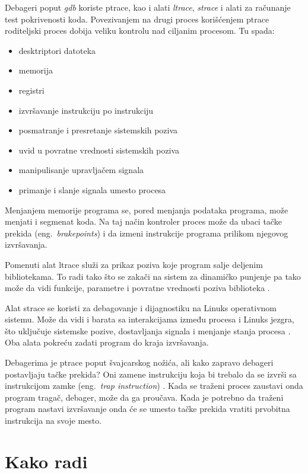 \documentclass[a4paper]{article}
\begin{document}
Debageri poput \emph{gdb} koriste ptrace, kao i alati \emph{ltrace}, \emph{strace} i alati za računanje test pokrivenosti koda.
Povezivanjem na drugi proces korišćenjem ptrace roditeljski proces dobija veliku kontrolu nad ciljanim procesom.
Tu spada:
\begin{itemize}
    \item desktriptori datoteka
    \item memorija
    \item registri
    \item izvršavanje instrukciju po instrukciju
    \item posmatranje i presretanje sistemskih poziva
    \item uvid u povratne vrednosti sistemskih poziva
    \item manipulisanje upravljačem signala
    \item primanje i slanje signala umesto procesa
\end{itemize}

Menjanjem memorije programa se, pored menjanja podataka programa, može menjati i segmenat koda. 
Na taj način kontroler proces može da ubaci tačke prekida  (eng.~{\em brakepoints}) i da izmeni instrukcije 
programa prilikom njegovog izvršavanja.

Pomenuti alat ltrace služi za prikaz poziva koje program salje deljenim bibliotekama. To radi tako što se zakači na sistem
za dinamičko punjenje pa tako može da vidi funkcije, parametre i povratne vrednosti poziva biblioteka \cite{lman}.

Alat strace se koristi za debagovanje i dijagnostiku na Linuks operativnom sistemu. 
Može da vidi i barata sa interakcijama između procesa i Linuks jezgra, što uključuje sistemske pozive, dostavljanja signala 
i menjanje stanja procesa \cite{sman}.
Oba alata pokreću zadati program do kraja izvršavanja.

Debagerima je ptrace poput švajcarskog nožića, ali kako zapravo debageri postavljaju tačke prekida? 
Oni zamene instrukciju koja bi trebalo da se izvrši sa instrukcijom zamke 
(eng.~{\em trap instruction}) \cite{journal}. Kada se traženi proces zaustavi onda program tragač, debager, može da
ga proučava. Kada je potrebno da traženi program nastavi izvršavanje onda će se umesto tačke prekida vratiti 
prvobitna instrukcija na svoje mesto.

\section{Kako radi}
\end{document}
